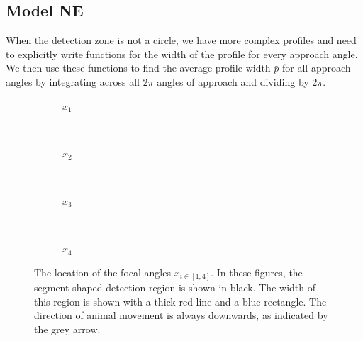 \subsection{Model NE} \label{NE}

When the detection zone is not a circle, we have more complex profiles  and need to explicitly write functions for the width of the profile for every approach angle. We then use these functions to find the average profile width $\bar{p}$ for all approach angles by integrating across all $2\pi$ angles of approach and dividing by $2\pi$. 



\begin{figure}[t]
        \centering
        \begin{subfigure}[t]{0.34\textwidth}
                \centering
                \caption{$x_1$}
                \label{f:tikz1}
        \end{subfigure}
        ~ 
        \begin{subfigure}[t]{0.22\textwidth}
                \centering
                \caption{$x_2$}
                \label{f:x2}
        \end{subfigure}
        ~ 
	\begin{subfigure}[t]{0.22\textwidth}
                \centering
                \caption{$x_3$}
                \label{f:x3}
        \end{subfigure}%
	~
	\begin{subfigure}[t]{0.22\textwidth}
                \centering
                \caption{$x_4$}
                \label{f:x4}
        \end{subfigure}%
\caption{The location of the focal angles $x_{i\in[1,4]}$. In these figures, the segment shaped detection region is shown in black. The width of this region is shown with a thick red line and a blue rectangle. The direction of animal movement is always downwards, as indicated by the grey arrow.}
\label{f:xis}
\end{figure}




